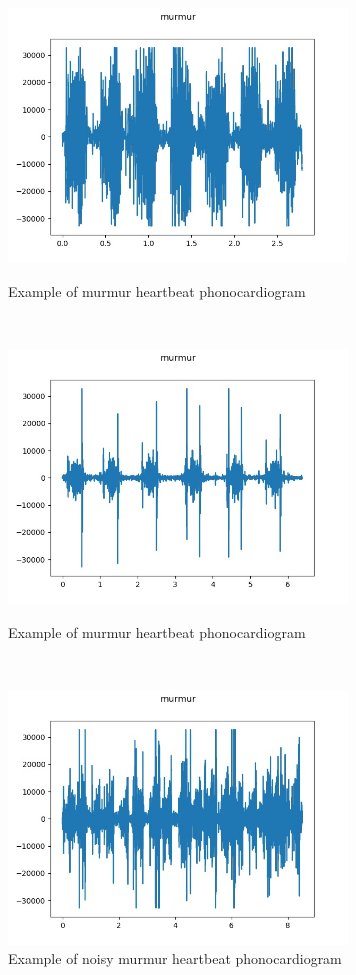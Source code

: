 \documentclass[11pt, a4papper]{report}
\theoremstyle{plain}
\theoremstyle{definition}
\theoremstyle{definition}
\theoremstyle{proposition}
\begin{document}
\begin{figure}[H]
\includegraphics[width=9cm]{img/beforenorm/murmur__171_1307971016233_D.jpg}
\centering
\caption{Example of murmur heartbeat phonocardiogram}
\

\includegraphics[width=9cm]{img/beforenorm/murmur__242_1309197394064_B.jpg}
\centering
\caption{Example of murmur heartbeat phonocardiogram}
\

\includegraphics[width=9cm]{img/beforenorm/murmur_noisymurmur_162_1307101835989_B_1.jpg}
\centering
\caption{Example of noisy murmur heartbeat phonocardiogram}
\end{figure}
\
\end{document}
